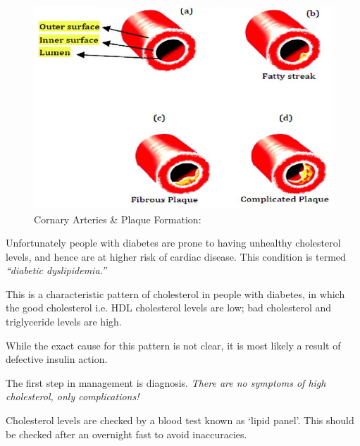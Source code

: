 {\begin{figure}
\includegraphics{images/044.jpg}
\caption{Cornary Arteries \& Plaque Formation:}
\end{figure}

Unfortunately people with diabetes are prone to having unhealthy cholesterol levels, and hence are at higher risk of cardiac disease. This condition is termed \textit{“diabetic dyslipidemia.”}


This is a characteristic pattern of cholesterol in people with diabetes, in which the good cholesterol i.e. HDL cholesterol levels are low; bad cholesterol and triglyceride levels are high.

While the exact cause for this pattern is not clear, it is most likely a result of defective insulin action.



The first step in management is diagnosis. \textit{There are no symptoms of high cholesterol, only complications!}

Cholesterol levels are checked by a blood test known as ‘lipid panel’. This should be checked after an overnight fast to avoid inaccuracies.


}
